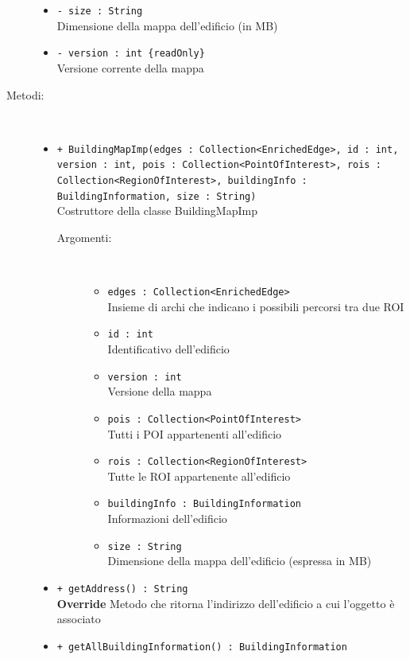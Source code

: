 \documentclass[../DefinizioneDiProdotto.tex]{subfiles}
\begin{document}
\begin{description}
\begin{itemize}
		\item \texttt{- size : String}\\
		Dimensione della mappa dell'edificio (in MB)
		
		\item \texttt{- version : int \{readOnly\}}\\
		Versione corrente della mappa
		
	\end{itemize}
	\item[Metodi:] \
	\begin{itemize}
		\item \texttt{+ BuildingMapImp(edges : Collection<EnrichedEdge>, id : int, version : int, pois : Collection<PointOfInterest>, rois : Collection<RegionOfInterest>, buildingInfo : BuildingInformation, size : String)}\\
		Costruttore della classe BuildingMapImp
		\begin{description}
			\item[Argomenti:] \
			\begin{itemize}
				\item \texttt{edges : Collection<EnrichedEdge>}\\
				Insieme di archi che indicano i possibili percorsi tra due ROI\item \texttt{id : int}\\
				Identificativo dell'edificio\item \texttt{version : int}\\
				Versione della mappa\item \texttt{pois : Collection<PointOfInterest>}\\
				Tutti i POI appartenenti all'edificio\item \texttt{rois : Collection<RegionOfInterest>}\\
				Tutte le ROI appartenente all'edificio\item \texttt{buildingInfo : BuildingInformation}\\
				Informazioni dell'edificio\item \texttt{size : String}\\
				Dimensione della mappa dell'edificio (espressa in MB)\end{itemize}
		\end{description}
		\item \texttt{+ getAddress() : String}\\
		\textbf{Override} Metodo che ritorna l'indirizzo dell'edificio a cui l'oggetto è associato
		\item \texttt{+ getAllBuildingInformation() : BuildingInformation}\\

\end{itemize}
\end{description}
\end{document}
